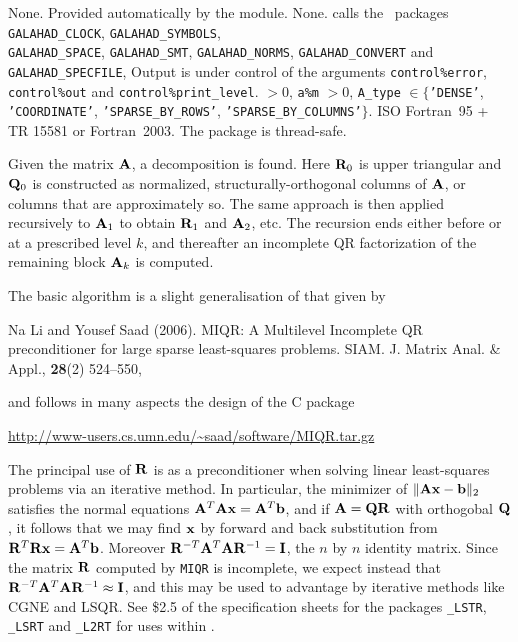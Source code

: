 \documentclass{galahad}
\newcommand{\packagename}{MIQR}
\begin{document}

\galgeneral

\galcommon None.
\galworkspace Provided automatically by the module.
\galroutines None. 
\galmodules {\tt \packagename\_form} calls the \galahad\ packages
{\tt GALAHAD\_CLOCK},
{\tt GALAHAD\_SY\-M\-BOLS}, \\
{\tt GALAHAD\-\_SPACE},
{\tt GALAHAD\_SMT},
{\tt GALAHAD\_NORMS},
{\tt GALAHAD\_CONVERT} and
{\tt GALAHAD\_SPECFILE},
\galio Output is under control of the arguments
 {\tt control\%error}, {\tt control\%out} and {\tt control\%print\_level}.
 $> 0$, {\tt a\%m} $>  0$, 
{\tt A\_type} $\in \{${\tt 'DENSE'},  {\tt 'COORDINATE'}, 
{\tt 'SPARSE\_BY\_ROWS'}, {\tt 'SPARSE\_BY\_COLUMNS'}$\}$. 
\galportability ISO Fortran~95 + TR 15581 or Fortran~2003. 
The package is thread-safe.



\galmethod

Given the matrix ${\mathbf{A}}$, a decomposition
is found. Here ${\mathbf{R}}_0$ is upper triangular and 
${\mathbf{Q}}_0$ is constructed as normalized,
structurally-orthogonal columns of ${\mathbf{A}}$, or columns that are approximately
so. The same approach is then applied
recursively to ${\mathbf{A}}_1$ to obtain ${\mathbf{R}}_1$ and ${\mathbf{A}}_2$, etc. The
recursion ends either before or at a prescribed level $k$, and thereafter
an incomplete QR factorization of the remaining block ${\mathbf{A}}_k$ is computed.

\noindent
The basic algorithm is a slight generalisation of that given by
\vspace*{1mm}

\noindent
Na Li and Yousef Saad (2006).
MIQR: A Multilevel Incomplete QR preconditioner for large sparse 
least-squares problems.
SIAM. J. Matrix Anal. \& Appl., {\bf 28}(2) 524--550,
\vspace*{1mm}

\noindent
and follows in many aspects the design of the C package

\url{http://www-users.cs.umn.edu/~saad/software/MIQR.tar.gz}

\noindent
The principal use of ${\mathbf{R}}$ is as a preconditioner when solving
linear least-squares problems via an iterative method. In particular,
the minimizer of $\|{\mathbf{A}}{\mathbf{x}}-{\mathbf{b}}\|_2$ satisfies the normal equations
${\mathbf{A}}^T {\mathbf{A}} {\mathbf{x}} = {\mathbf{A}}^T {\mathbf{b}}$, and if ${\mathbf{A}} = {\mathbf{Q}} {\mathbf{R}}$
with orthogobal ${\mathbf{Q}}$, it follows
that we may find ${\mathbf{x}}$ by forward and back substitution from
${\mathbf{R}}^T {\mathbf{R}} {\mathbf{x}} = {\mathbf{A}}^T {\mathbf{b}}$. Moreover 
${\mathbf{R}}^{-T} {\mathbf{A}}^T {\mathbf{A}} {\mathbf{R}}^{-1} = {\mathbf{I}}$, 
the $n$ by $n$ identity matrix. Since the matrix ${\mathbf{R}}$
computed by {\tt \packagename} is incomplete, we expect instead that
${\mathbf{R}}^{-T} {\mathbf{A}}^T {\mathbf{A}} {\mathbf{R}}^{-1} \approx {\mathbf{I}}$, and this may be used
to advantage by iterative methods like CGNE and LSQR. See \$2.5 of
the specification sheets for the packages
{\tt \libraryname\_LSTR},
{\tt \libraryname\_LSRT} 
and 
{\tt \libraryname\_L2RT} for uses within \galahad.
\end{document}
